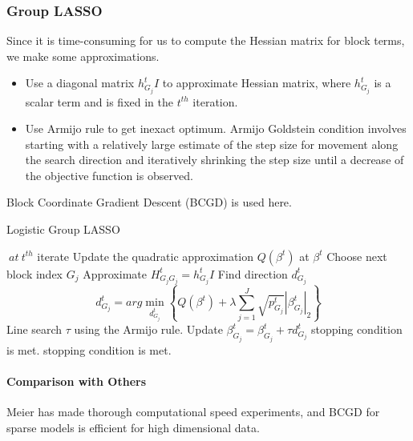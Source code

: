 \documentclass[]{article}
\begin{document}
\subsubsection{Group LASSO}
Since it is time-consuming for us to compute the Hessian matrix for block terms, we make some approximations.
\begin{itemize}
	\item Use a diagonal matrix $ h_{G_j}^t I $ to approximate Hessian matrix, where $ h_{G_j}^t $ is a scalar term and is fixed in the $ t^{th} $ iteration.
	\item Use Armijo rule\cite{liu1991optimization} to get inexact optimum. Armijo Goldstein condition involves starting with a relatively large estimate of the step size for movement along the search direction and iteratively shrinking the step size until a decrease of the objective function is observed.
\end{itemize}
Block Coordinate Gradient Descent (BCGD)\cite{tseng2009coordinate} is used here.
\begin{algorithm}  
	\caption{Logistic Group LASSO}  
	\begin{algorithmic}[1] %
		\Repeat $\ at\ t^{th}$ iterate
		\State Update the quadratic approximation $ Q(\beta^t) $ at $\beta^t$
		\Repeat
		\State Choose next block index $ {G_j} $
		\State Approximate $H_{G_jG_j}^t=h_{G_j}^t I$
		\State Find direction $ d_{G_j}^t $
		\State \begin{equation*}
		d_{G_j}^t=arg\min\limits_{d_{G_j}^t}\left\{Q(\beta^t)+\lambda\sum_{j=1}^J \sqrt{p_{G_j}^t}|\beta_{G_j}^t|_2\right\}
		\end{equation*}
		\State Line search $ \tau $ using the Armijo rule.
		\State Update $ \beta^t_{G_j}=\beta^t_{G_j}+\tau d^t_{G_j}$
		\Until stopping condition is met.
		\Until stopping condition is met.
	\end{algorithmic}
\end{algorithm}
\paragraph{Comparison with Others}
Meier has made thorough computational speed experiments, and BCGD for sparse models is efficient for high dimensional data\cite{meier2008group}.
\end{document}
